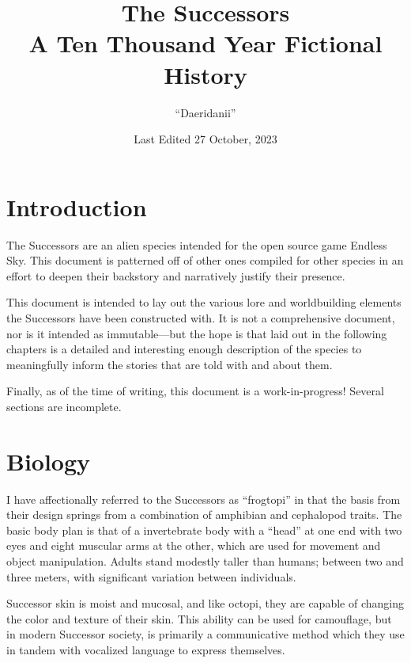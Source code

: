 \documentclass[11pt]{report}
\title{%
    The Successors \\ 
    \smallskip
    \large A Ten Thousand Year Fictional History}
\author{``Daeridanii''}
\date{Last Edited 27 October, 2023}
\begin{document}
    \maketitle
    \tableofcontents
    \newpage
    \section{Introduction}
    The Successors are an alien species intended for the open source game Endless Sky. This document is patterned off of other ones compiled for other species in an effort to deepen their backstory and narratively justify their presence.
    
    This document is intended to lay out the various lore and worldbuilding elements the Successors have been constructed with. It is not a comprehensive document, nor is it intended as immutable---but the hope is that laid out in the following chapters is a detailed and interesting enough description of the species to meaningfully inform the stories that are told with and about them.

    Finally, as of the time of writing, this document is a work-in-progress! Several sections are incomplete.

    \section{Biology}
    I have affectionally referred to the Successors as ``frogtopi'' in that the basis from their design springs from a combination of amphibian and cephalopod traits. The basic body plan is that of a invertebrate body with a ``head'' at one end with two eyes and eight muscular arms at the other, which are used for movement and object manipulation. Adults stand modestly taller than humans; between two and three meters, with significant variation between individuals. 

    Successor skin is moist and mucosal, and like octopi, they are capable of changing the color and texture of their skin. This ability can be used for camouflage, but in modern Successor society, is primarily a communicative method which they use in tandem with vocalized language to express themselves.
    
\end{document}
